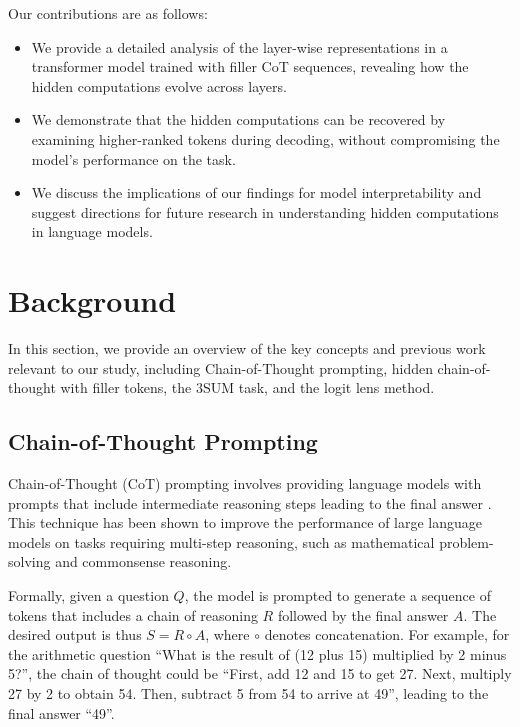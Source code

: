 \documentclass{article}
\begin{document}
Our contributions are as follows:

\begin{itemize}
    \item We provide a detailed analysis of the layer-wise representations in a transformer model trained with filler CoT sequences, revealing how the hidden computations evolve across layers.
    \item We demonstrate that the hidden computations can be recovered by examining higher-ranked tokens during decoding, without compromising the model's performance on the task.
    \item We discuss the implications of our findings for model interpretability and suggest directions for future research in understanding hidden computations in language models.
\end{itemize}

\newpage
\section{Background}

In this section, we provide an overview of the key concepts and previous work relevant to our study, including Chain-of-Thought prompting, hidden chain-of-thought with filler tokens, the 3SUM task, and the logit lens method.

\subsection{Chain-of-Thought Prompting}

Chain-of-Thought (CoT) prompting involves providing language models with prompts that include intermediate reasoning steps leading to the final answer \cite{wei2022chain}. This technique has been shown to improve the performance of large language models on tasks requiring multi-step reasoning, such as mathematical problem-solving and commonsense reasoning.

Formally, given a question $Q$, the model is prompted to generate a sequence of tokens that includes a chain of reasoning $R$ followed by the final answer $A$. The desired output is thus $S = R \circ A$, where $\circ$ denotes concatenation. For example, for the arithmetic question ``What is the result of (12 plus 15) multiplied by 2 minus 5?'', the chain of thought could be ``First, add 12 and 15 to get 27. Next, multiply 27 by 2 to obtain 54. Then, subtract 5 from 54 to arrive at 49'', leading to the final answer ``49''.
\end{document}
